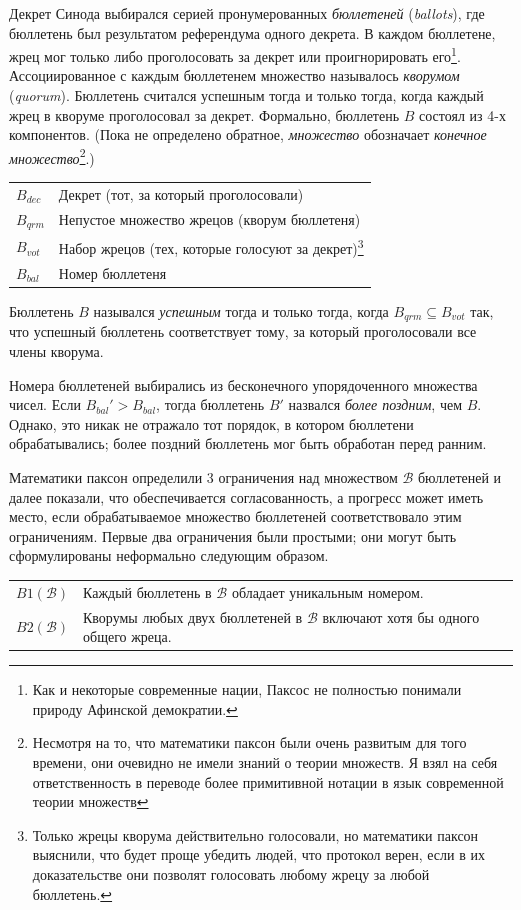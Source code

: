 \documentclass[12pt, a4paper]{article} %
\begin{document}
Декрет Синода выбирался серией пронумерованных \textit{бюллетеней} (\textit{ballots}), где бюллетень был результатом референдума одного декрета. В каждом бюллетене, жрец мог только либо проголосовать за декрет или проигнорировать его\footnote{Как и некоторые современные нации, Паксос не полностью понимали природу Афинской демократии.}. Ассоциированное с каждым бюллетенем множество называлось \textit{кворумом} (\textit{quorum}). Бюллетень считался успешным тогда и только тогда, когда каждый жрец в кворуме проголосовал за декрет.  Формально, бюллетень $B$ состоял из 4-х компонентов. (Пока не определено обратное, \textit{множество} обозначает \textit{конечное множество}\footnote{Несмотря на то, что математики паксон были очень развитым для того времени, они очевидно не имели знаний о теории множеств. Я взял на себя ответственность в переводе более примитивной нотации в язык современной теории множеств}.)
\begin{table}[h]
\begin{tabular}{ l p{10.5cm}}
    $B_{dec}$ & Декрет (тот, за который проголосовали)\\
    $B_{qrm}$ & Непустое множество жрецов (кворум бюллетеня)\\
    $B_{vot}$ & Набор жрецов (тех, которые голосуют за декрет)\footnote{Только жрецы кворума действительно голосовали, но математики паксон выяснили, что будет проще убедить людей, что протокол верен, если в их доказательстве они позволят голосовать любому жрецу за любой бюллетень.}\\
    $B_{bal}$ & Номер бюллетеня
\end{tabular}
\end{table}

Бюллетень $B$ назывался \textit{успешным} тогда и только тогда, когда $B_{qrm} \subseteq B_{vot}$ так, что успешный бюллетень соответствует тому, за который проголосовали все члены кворума.

Номера бюллетеней выбирались из бесконечного упорядоченного множества чисел. Если $B_{bal}' > B_{bal}$, тогда бюллетень $B'$ назвался \textit{более поздним}, чем $B$. Однако, это никак не отражало тот порядок, в котором бюллетени обрабатывались; более поздний бюллетень мог быть обработан перед ранним.

Математики паксон определили 3 ограничения над множеством $\mathcal{B}$ бюллетеней и далее показали, что обеспечивается согласованность, а прогресс может иметь место, если обрабатываемое множество бюллетеней соответствовало этим ограничениям. Первые два ограничения были простыми; они могут быть сформулированы неформально следующим образом.
\begin{table}[h]
\begin{tabular}{l p{10.5cm}}
    $B1(\mathcal{B})$ & Каждый бюллетень в $\mathcal{B}$ обладает уникальным номером.\\
    $B2(\mathcal{B})$ & Кворумы любых двух бюллетеней в $\mathcal{B}$ включают хотя бы одного общего жреца.
\end{tabular}
\end{table}
\end{document}
